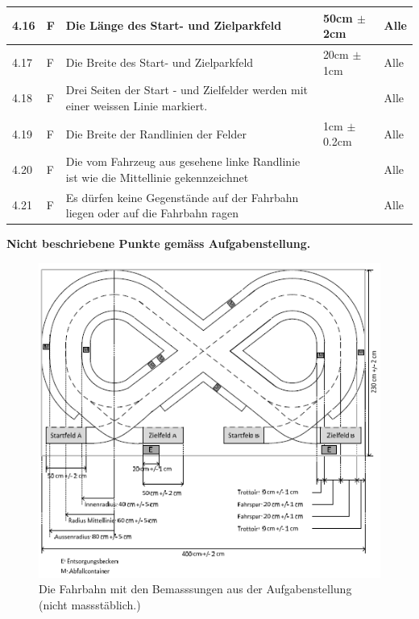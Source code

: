 \begin{center}
\begin{tabular}{|p{1cm}|p{0.5cm}|p{5cm}|p{5cm}|p{1.5cm}|}
 4.16 & F & Die Länge des Start- und Zielparkfeld & 50cm $\pm$ 2cm & Alle\\ \hline
 4.17 & F & Die Breite des Start- und Zielparkfeld & 20cm $\pm$ 1cm & Alle\\ \hline
 4.18 & F & Drei Seiten der Start - und Zielfelder werden mit einer weissen Linie markiert. & & Alle\\ \hline
 4.19 & F & Die Breite der Randlinien der Felder & 1cm $\pm$ 0.2cm & Alle\\ \hline
 4.20 & F & Die vom Fahrzeug aus gesehene linke Randlinie ist wie die Mittellinie gekennzeichnet & & Alle\\\hline
 4.21 & F & Es dürfen keine Gegenstände auf der Fahrbahn liegen oder auf die Fahrbahn ragen & & Alle\\\hline
\end{tabular}
 \textbf{Nicht beschriebene Punkte gemäss Aufgabenstellung.}
\end{center}

\begin{figure}[ht]
	\centering									
	\includegraphics{Images/Fahrbahn.png}
	\caption{Die Fahrbahn mit den Bemasssungen aus der Aufgabenstellung (nicht massstäblich.)}
	\label{fig1}
\end{figure}